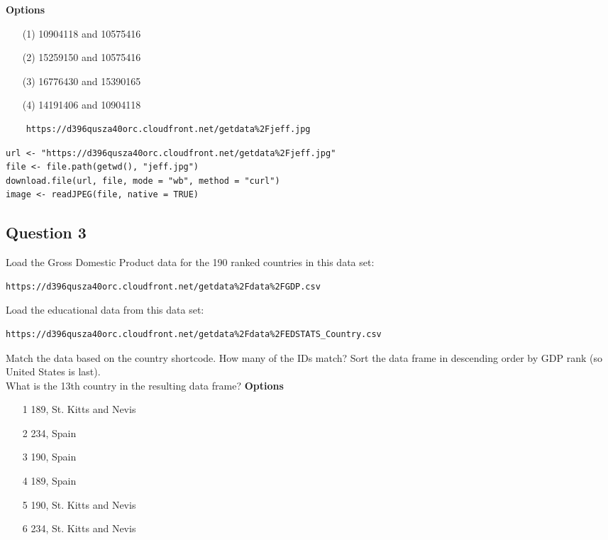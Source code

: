 \documentclass[]{article}
\begin{document}
\bigskip
\textbf{Options}
\begin{itemize}
\item[(1)] 10904118 and 10575416
\item[(2)] 15259150 and 10575416
\item[(3)] 16776430 and 15390165
\item[(4)] 14191406 and 10904118
\end{itemize}


\begin{framed}
	\begin{verbatim}
	https://d396qusza40orc.cloudfront.net/getdata%2Fjeff.jpg
	\end{verbatim}
\end{framed}


\begin{framed}
\begin{verbatim}
url <- "https://d396qusza40orc.cloudfront.net/getdata%2Fjeff.jpg"
file <- file.path(getwd(), "jeff.jpg")
download.file(url, file, mode = "wb", method = "curl")
image <- readJPEG(file, native = TRUE)
\end{verbatim}
\end{framed}
\newpage
\subsection*{Question 3}
Load the Gross Domestic Product data for the 190 ranked countries in this data set: 

\begin{verbatim}
https://d396qusza40orc.cloudfront.net/getdata%2Fdata%2FGDP.csv 
\end{verbatim}
Load the educational data from this data set: 
\begin{verbatim}
https://d396qusza40orc.cloudfront.net/getdata%2Fdata%2FEDSTATS_Country.csv 
\end{verbatim}
Match the data based on the country shortcode. How many of the IDs match? Sort the data frame in descending order by GDP rank (so United States is last). 
\\
What is the 13th country in the resulting data frame? 
\bigskip
\textbf{Options}
\begin{itemize}
\item[1] 189, St. Kitts and Nevis
\item[2] 234, Spain
\item[3] 190, Spain
\item[4] 189, Spain
\item[5] 190, St. Kitts and Nevis
\item[6] 234, St. Kitts and Nevis
\end{itemize}
\end{document}
